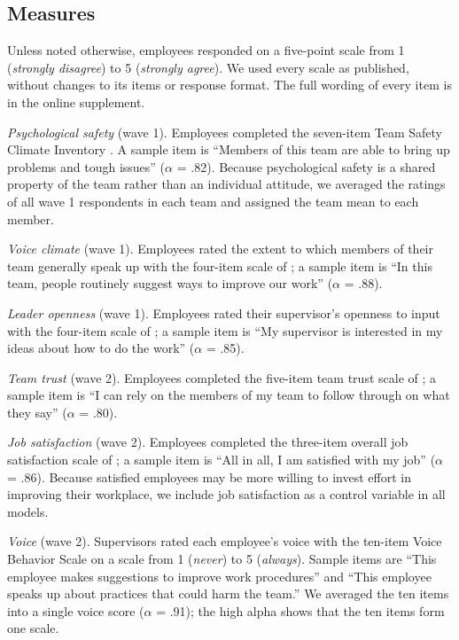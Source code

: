 \documentclass[11pt]{article}
\begin{document}
\subsection{Measures}

Unless noted otherwise, employees responded on a five-point scale from 1 (\textit{strongly disagree}) to 5 (\textit{strongly agree}). We used every scale as published, without changes to its items or response format. The full wording of every item is in the online supplement.

\textit{Psychological safety} (wave 1). Employees completed the seven-item Team Safety Climate Inventory \citep{harlow2009}. A sample item is ``Members of this team are able to bring up problems and tough issues'' ($\alpha$ = .82). Because psychological safety is a shared property of the team rather than an individual attitude, we averaged the ratings of all wave 1 respondents in each team and assigned the team mean to each member.

\textit{Voice climate} (wave 1). Employees rated the extent to which members of their team generally speak up with the four-item scale of \citet{quenby2015}; a sample item is ``In this team, people routinely suggest ways to improve our work'' ($\alpha$ = .88).

\textit{Leader openness} (wave 1). Employees rated their supervisor's openness to input with the four-item scale of \citet{dranfield2010}; a sample item is ``My supervisor is interested in my ideas about how to do the work'' ($\alpha$ = .85).

\textit{Team trust} (wave 2). Employees completed the five-item team trust scale of \citet{marisco2012}; a sample item is ``I can rely on the members of my team to follow through on what they say'' ($\alpha$ = .80).

\textit{Job satisfaction} (wave 2). Employees completed the three-item overall job satisfaction scale of \citet{tolland2006}; a sample item is ``All in all, I am satisfied with my job'' ($\alpha$ = .86). Because satisfied employees may be more willing to invest effort in improving their workplace, we include job satisfaction as a control variable in all models.

\textit{Voice} (wave 2). Supervisors rated each employee's voice with the ten-item Voice Behavior Scale \citep{randell2011} on a scale from 1 (\textit{never}) to 5 (\textit{always}). Sample items are ``This employee makes suggestions to improve work procedures'' and ``This employee speaks up about practices that could harm the team.'' We averaged the ten items into a single voice score ($\alpha$ = .91); the high alpha shows that the ten items form one scale.
\end{document}
